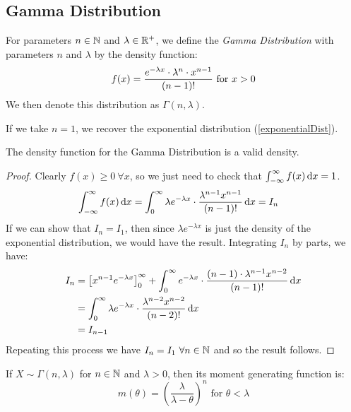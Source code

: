 \documentclass[../main.tex]{subfiles}
\begin{document}
\subsection{Gamma Distribution}
\begin{definition}
  For parameters $n \in \mathbb{N}$ and $\lambda \in \mathbb{R}^{+}$, we define the \textit{Gamma Distribution} with parameters $n$ and $\lambda$ by the density function:
  \[
    f(x) = \frac{e^{-\lambda x} \cdot \lambda^{n} \cdot x^{n - 1}}{(n - 1)!} \text{ for $ x > 0$}
  \]
  We then denote this distribution as $\Gamma(n, \lambda)$.
\end{definition}
\begin{remark}
  If we take $n = 1$, we recover the exponential distribution (\cref{exponentialDist}).
\end{remark}
\begin{lemma}
  The density function for the Gamma Distribution is a valid density. \label{gammaValid}
\end{lemma}
\begin{proof}
  Clearly $f(x) \geq 0\ \forall x$, so we just need to check that $\int_{-\infty}^{\infty} f(x) \d{x} = 1$.
  \begin{align*}
    \int_{-\infty}^{\infty} f(x) \d{x} &= \int_{0}^{\infty} \lambda e^{- \lambda x} \cdot \frac{\lambda^{n - 1} x^{n - 1}}{(n - 1)!} \d{x} = I_n
  \end{align*}
  If we can show that $I_n = I_1$, then since $\lambda e^{-\lambda x}$ is just the density of the exponential distribution, we would have the result.
  Integrating $I_n$ by parts, we have:
  \begin{align*}
    I_n &= \eval{x^{n - 1}e^{-\lambda x}}{0}{\infty} + \int_{0}^{\infty} e^{-\lambda x} \cdot \frac{(n - 1) \cdot \lambda^{n - 1}x^{n - 2}}{(n - 1)!} \d{x}\\
        &= \int_{0}^{\infty} \lambda e^{-\lambda x} \cdot \frac{\lambda^{n - 2} x^{n - 2}}{(n - 2)!} \d{x} \\
        &= I_{n - 1}
  \end{align*}
  Repeating this process we have $I_n = I_1\ \forall n \in \mathbb{N}$ and so the result follows.
\end{proof}
\begin{lemma}
  If $X \sim \Gamma(n, \lambda)$ for $n \in \mathbb{N}$ and  $\lambda > 0$, then its moment generating function is: \label{mgfGamma}
  \[
    m(\theta) = \left(\frac{\lambda}{\lambda - \theta}\right)^{n} \text{ for $\theta < \lambda$}
  \]
\end{lemma}
\end{document}
